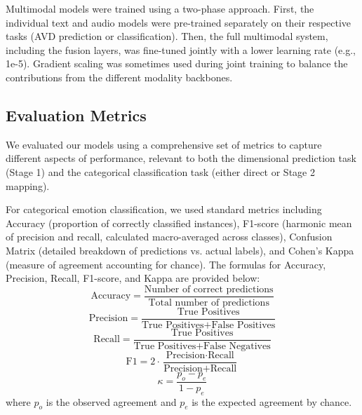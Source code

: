 \documentclass[12pt]{article}
\begin{document}
Multimodal models were trained using a two-phase approach. First, the individual text and audio models were pre-trained separately on their respective tasks (AVD prediction or classification). Then, the full multimodal system, including the fusion layers, was fine-tuned jointly with a lower learning rate (e.g., 1e-5). Gradient scaling was sometimes used during joint training to balance the contributions from the different modality backbones.

\subsection{Evaluation Metrics}
We evaluated our models using a comprehensive set of metrics to capture different aspects of performance, relevant to both the dimensional prediction task (Stage 1) and the categorical classification task (either direct or Stage 2 mapping).

For categorical emotion classification, we used standard metrics including Accuracy (proportion of correctly classified instances), F1-score (harmonic mean of precision and recall, calculated macro-averaged across classes), Confusion Matrix (detailed breakdown of predictions vs. actual labels), and Cohen's Kappa (measure of agreement accounting for chance). The formulas for Accuracy, Precision, Recall, F1-score, and Kappa are provided below:
    \begin{equation}
        \text{Accuracy} = \frac{\text{Number of correct predictions}}{\text{Total number of predictions}}
    \end{equation}
    \begin{equation}
        \text{Precision} = \frac{\text{True Positives}}{\text{True Positives} + \text{False Positives}}
    \end{equation}
    \begin{equation}
        \text{Recall} = \frac{\text{True Positives}}{\text{True Positives} + \text{False Negatives}}
    \end{equation}
\begin{equation}
    \text{F1} = 2 \cdot \frac{\text{Precision} \cdot \text{Recall}}{\text{Precision} + \text{Recall}}
\end{equation}
    \begin{equation}
        \kappa = \frac{p_o - p_e}{1 - p_e}
    \end{equation}
    where $p_o$ is the observed agreement and $p_e$ is the expected agreement by chance.
\end{document}
